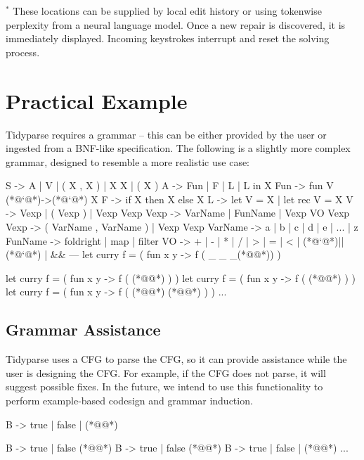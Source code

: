 \documentclass[sigplan,review,anonymous,acmsmall]{acmart}\settopmatter{printfolios=false,printccs=false,printacmref=false}
\begin{document}
    \noindent $^*$ These locations can be supplied by local edit history or using tokenwise perplexity from a neural language model. Once a new repair is discovered, it is immediately displayed. Incoming keystrokes interrupt and reset the solving process.


    \section{Practical Example}

    Tidyparse requires a grammar -- this can be either provided by the user or ingested from a BNF-like specification. The following is a slightly more complex grammar, designed to resemble a more realistic use case:

\begin{tidyinput}
S -> A | V | ( X , X ) | X X | ( X )
A -> Fun | F | L | L in X
Fun -> fun V (*@`@*)->(*@`@*) X
F -> if X then X else X
L -> let V = X | let rec V = X
V -> Vexp | ( Vexp ) | Vexp Vexp
Vexp -> VarName | FunName | Vexp VO Vexp
Vexp -> ( VarName , VarName ) | Vexp Vexp
VarName -> a | b | c | d | e | ... | z
FunName -> foldright | map | filter
VO ->  + | - | * | / | > | = | < | (*@`@*)||(*@`@*) | &&
---
let curry f = ( fun x y -> f ( _ _ _(*@\caret{ }@*)) )
\end{tidyinput}
\begin{tidyoutput}
let curry f = ( fun x y -> f ( (*@@*) ) )
let curry f = ( fun x y -> f ( (*@@*) ) )
let curry f = ( fun x y -> f ( (*@@*) (*@@*) ) )
...
\end{tidyoutput}

    \subsection{Grammar Assistance}

    Tidyparse uses a CFG to parse the CFG, so it can provide assistance while the user is designing the CFG. For example, if the CFG does not parse, it will suggest possible fixes. In the future, we intend to use this functionality to perform example-based codesign and grammar induction.

\begin{tidyinput}
B -> true | false | (*@\caret{ }@*)
\end{tidyinput}
\begin{tidyoutput}
B -> true | false (*@\hlred{ }@*)
B -> true | false (*@@*)
B -> true | false | (*@@*)
...
\end{tidyoutput}
\end{document}
